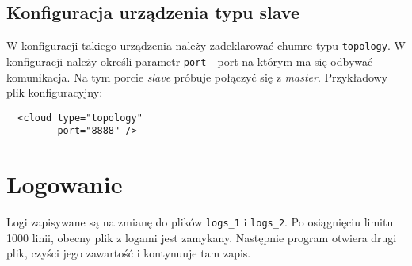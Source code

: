 \documentclass[11pt]{article}
\begin{document}
\subsection{Konfiguracja urządzenia typu slave}
W konfiguracji takiego urządzenia należy zadeklarować chumre typu \verb|topology|. W konfiguracji
należy określi parametr \verb|port| - port na którym ma się odbywać komunikacja. Na tym porcie \textit{slave} próbuje połączyć
się z \textit{master}. Przykładowy plik konfiguracyjny:
\begin{verbatim}
  <cloud type="topology" 
         port="8888" />
\end{verbatim}


\section{Logowanie}

Logi zapisywane są na zmianę do plików \verb|logs_1| i \verb|logs_2|. Po osiągnięciu limitu 1000 linii, obecny plik z logami jest zamykany. Następnie program otwiera drugi plik, czyści jego zawartość i kontynuuje tam zapis. 

\end{document}
